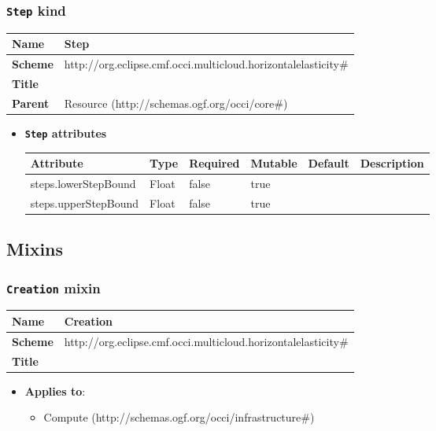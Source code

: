 \subsubsection{\texttt{Step} kind}
\begin{center}
\begin{tabular}{|l|l|}
  \hline
  \textbf{Name} & Step \\
  \hline  
  \textbf{Scheme} & http://org.eclipse.cmf.occi.multicloud.horizontalelasticity\# \\
  \hline
  \textbf{Title} &  \\
  \hline
  \textbf{Parent} & Resource (http://schemas.ogf.org/occi/core\#) \\
  \hline
\end{tabular}
\end{center}
\begin{itemize}
\item \textbf{\texttt{Step} attributes}

\begin{tabularx}{\textwidth}{|l|l|p{1.4cm}|p{1.3cm}|l|X|}
  \hline
  \textbf{Attribute} & \textbf{Type} & \textbf{Required} & \textbf{Mutable} & \textbf{Default} & \textbf{Description} \\
  \hline  
  steps.lowerStepBound & Float & false & true &  &  \\
  \hline
  steps.upperStepBound & Float & false & true &  &  \\
  \hline
\end{tabularx}
\end{itemize}



\subsection{Mixins}
\subsubsection{\texttt{Creation} mixin}
\begin{center}
\begin{tabular}{|l|l|}
  \hline
  \textbf{Name} & Creation \\
  \hline  
  \textbf{Scheme} & http://org.eclipse.cmf.occi.multicloud.horizontalelasticity\# \\
  \hline
  \textbf{Title} &  \\
  \hline
\end{tabular}
\end{center}
\begin{itemize}
\item \textbf{Applies to}:
\begin{itemize}
	\item Compute (http://schemas.ogf.org/occi/infrastructure\#)
\end{itemize}
\end{itemize} 

